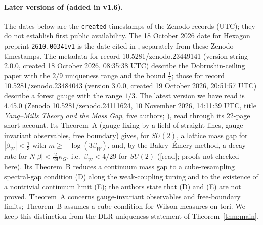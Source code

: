 \documentclass[11pt,a4paper]{article}
\theoremstyle{remark}
\theoremstyle{definition}
\theoremstyle{plain}
\theoremstyle{remark}
\newcommand{\st}[1]{\textsf{[#1]}}
\begin{document}
\paragraph{Later versions of \cite{BB26} (added in v1.6).} The dates below are the \texttt{created} timestamps of the Zenodo records (UTC); they do not establish first public availability. The 18 October 2026 date for Hexagon preprint \texttt{2610.00341v1} is the date cited in \cite{BB26}, separately from these Zenodo timestamps. The metadata for record 10.5281/zenodo.23449141 (version string 2.0.0, created 18 October 2026, 08:35:38 UTC) describe the Dobrushin-ceiling paper with the $2/9$ uniqueness range and the bound $\frac14$; those for record 10.5281/zenodo.23484043 (version 3.0.0, created 19 October 2026, 20:51:57 UTC) describe a forest gauge with the range $1/3$.
The latest version we have read is 4.45.0 (Zenodo 10.5281/zenodo.24111624, 10 November 2026, 14:11:39 UTC, title \emph{Yang--Mills Theory and the Mass Gap}, five authors; \cite{BB26e}), read through its 22-page short account. Its Theorem~A (gauge fixing by a field of straight lines, gauge-invariant observables, free boundary) gives, for $SU(2)$, a lattice mass gap for $|\beta_W|<\frac13$ with $m\ge-\log(3\beta_W)$, and, by the Bakry--\'Emery method, a decay rate for $N|\beta|<\frac{2}{29}\kappa_G$, i.e.\ $\beta_W<4/29$ for $SU(2)$ (\st{read}; proofs not checked here). Its Theorem~B reduces a continuum mass gap to a cube-resampling spectral-gap condition (D) along the weak-coupling tuning and to the existence of a nontrivial continuum limit (E); the authors state that (D) and (E) are not proved. Theorem~A concerns gauge-invariant observables and free-boundary limits; Theorem~B assumes a cube condition for Wilson measures on tori. We keep this distinction from the DLR uniqueness statement of Theorem~\ref{thm:main}.
\end{document}
